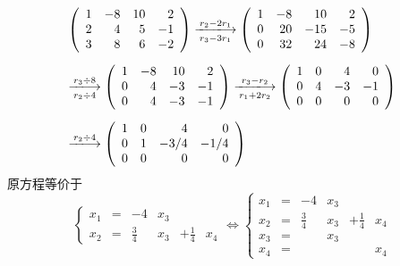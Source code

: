 \begin{frame}[allowframebreaks]
\begin{jie}
$$
\begin{array}{l}
  \left(
  \begin{array}{rrrr}
    1&-8&10&2\\
    2&4&5&-1\\
    3&8&6&-2
  \end{array}
           \right) \xlongrightarrow[r_3-3r_1]{r_2-2r_1}
           \left(
           \begin{array}{rrrr}
             1&-8&10&2\\
             0&20&-15&-5\\
             0&32&24&-8
           \end{array}
                      \right)\\[0.3in]
  \xlongrightarrow[r_2\div4]{r_3\div8}
  \left(
  \begin{array}{rrrr}
    1&-8&10&2\\
    0&4&-3&-1\\
    0&4&-3&-1
  \end{array}
            \right) \xlongrightarrow[r_1+2r_2]{r_3-r_2}
            \left(
            \begin{array}{rrrr}
              1&0&4&0\\
              0&4&-3&-1\\
              0&0&0&0
            \end{array}
                     \right) \\[0.3in]
  \xlongrightarrow[]{r_2\div4}
  \left(
  \begin{array}{rrrr}
    1&0&4&0\\
    0&1&-3/4&-1/4\\
    0&0&0&0
  \end{array}
           \right)
\end{array}
$$
原方程等价于
$$\left\{
  \begin{array}{rcrcrc}
    x_1&=&-4&x_3&&\\[0.1in]
    x_2&=&\frac34&x_3&+\frac14&x_4
  \end{array}
\right.  \Leftrightarrow
\left\{
  \begin{array}{rcrcrc}
    x_1&=&-4&x_3&&\\[0.1in]
    x_2&=&\frac34&x_3&+\frac14&x_4\\[0.1in]
    x_3&=&&x_3&&\\[0.1in]
    x_4&=&&&&x_4      
  \end{array}
$$
\end{jie}
\end{frame}
